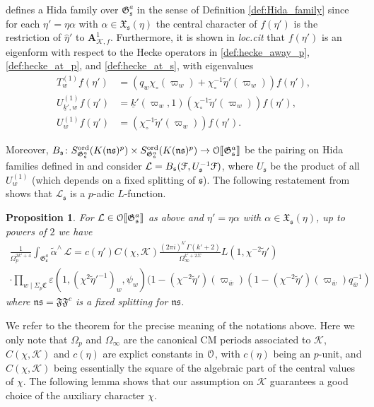 \documentclass[leqno]{amsart}
\newtheorem{prop}[thm]{Proposition}
\theoremstyle{definition}
\theoremstyle{remark}
\newcommand{\eo}{\EuScript{O}}
\newcommand{\A}{\mathbf A}
\newcommand{\fn}{\mathfrak{n}}
\newcommand{\fs}{\mathfrak{s}}
\newcommand{\K}{{\mathcal{K}}} %
\newcommand{\bw}{\overline{w}}
\newcommand{\fG}{\mathfrak{G}}
\newcommand{\fX}{\mathfrak{X}}
\newcommand{\wt}[1]{\underline{ #1 }}
\newcommand{\euF}{\EuScript{F}} %
\newcommand{\ord}{\textnormal{ord}} %
\begin{document}
defines a Hida family over $\fG_\fs^a$
in the sense of Definition \ref{def:Hida_family}
since for each $\eta'=\eta\alpha$ with $\alpha\in \fX_\fs(\eta)$
the central character of $f(\eta')$ 
is the restriction of $\hat{\eta}'$ to $\A_{\K,f}^1$.
Furthermore, it is shown in \textit{loc.cit} that $f(\eta')$ 
is an eigenform with respect to 
the Hecke operators in \eqref{def:hecke_away_p},
\eqref{def:hecke_at_p},
and \eqref{def:hecke_at_s}, with eigenvalues
\begin{align}
T_w^{(1)}f(\eta')&=
(q_w\chi_\circ(\varpi_w)+\chi_\circ^{-1}\tilde{\eta}'(\varpi_w))
f(\eta'),\\
U_{\wt{k}',w}^{(1)}f(\eta')&=
\wt{k}'(\varpi_w,1)(\chi_\circ^{-1}\tilde{\eta}'(\varpi_w))
f(\eta'),\\
U_{w}^{(1)}f(\eta')&=
(\chi_\circ^{-1}\tilde{\eta}'(\varpi_w))
f(\eta').
\end{align}

Moreover, 
$B_\fs\colon 
S_{\fG_\fs^a}^{\ord}(K(\fn\fs)^p)\times 
S_{\fG_\fs^a}^{\ord}(K(\fn\fs)^p)
\to \eo\llbracket\fG_\fs^a\rrbracket$ 
be the pairing on Hida families
defined in \cite[\S 6.4.1]{lee}
and consider
$\mathcal{L}=
B_\fs(\euF,U_\fs^{-1}\euF)$,
where $U_{\fs}$ be the product of all $U_w^{(1)}$
(which depends on a fixed splitting of $\fs$).
The following restatement from 
\cite[Thm 7.7]{lee}
shows that 
$\mathcal{L}_\fs$
is a $p$-adic $L$-function.

\begin{prop}\label{prop:function}
For 
$\mathcal{L}\in \eo\llbracket\fG_\fs^a\rrbracket$
as above and $\eta'=\eta\alpha$ with $\alpha\in \fX_\fs(\eta)$,
up to powers of $2$ we have
\begin{multline*}
	\frac{1}{\Omega_p^{2k'+4}}
	\int_{\fG_{\fs}^a}\tilde{\alpha}^\wedge\,\mathcal{L}=
	c(\eta')C(\chi,\K)
	\frac{(2\pi i)^{k'}\Gamma(k'+2)
	}{\Omega_\infty^{k'+2\Sigma}}
    L(1,\chi^{-2}\tilde{\eta}')\\\cdot
	\prod_{w\mid \Sigma_p\mathfrak{C}}
	\varepsilon(1,(\chi^{2}\tilde{\eta}'^{-1})_w,\psi_w)
	(1-(\chi^{-2}\tilde{\eta}')(\varpi_{\bw})
	(1-(\chi^{-2}\tilde{\eta}')(\varpi_{\bw})q_{\bw}^{-1})
\end{multline*}
where $\fn\fs=\mathfrak{F}\mathfrak{F}^c$
is a fixed splitting for $\fn\fs$.
\end{prop}
We refer to the theorem for the precise 
meaning of the notations above.
Here we only note that
$\Omega_p$ and $\Omega_\infty$
are the canonical CM periods associated to $\K$,
$C(\chi,\K)$ and $c(\eta)$ are explict constants in $\eo$,
with $c(\eta)$ being an $p$-unit,
and $C(\chi,\K)$ being
essentially the square of the algebraic part
of the central values of $\chi$.
The following lemma shows that
our assumption on $\K$
guarantees a good choice of the auxiliary character $\chi$.
\end{document}
